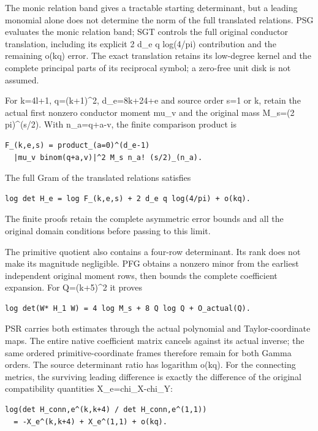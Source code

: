 \documentclass[
]{article}
\begin{document}
The monic relation band gives a tractable starting determinant, but a
leading monomial alone does not determine the norm of the full
translated relations. PSG evaluates the monic relation band; SGT
controls the full original conductor translation, including its explicit
2 d\_e q log(4/pi) contribution and the remaining o(kq) error. The exact
translation retains its low-degree kernel and the complete principal
parts of its reciprocal symbol; a zero-free unit disk is not assumed.

For k=4l+1, q=(k+1)\^{}2, d\_e=8k+24+e and source order s=1 or k, retain
the actual first nonzero conductor moment mu\_v and the original mass
M\_s=(2 pi)\^{}(s/2). With n\_a=q+a-v, the finite comparison product is

\begin{verbatim}
F_(k,e,s) = product_(a=0)^(d_e-1)
  |mu_v binom(q+a,v)|^2 M_s n_a! (s/2)_(n_a).
\end{verbatim}

The full Gram of the translated relations satisfies

\begin{verbatim}
log det H_e = log F_(k,e,s) + 2 d_e q log(4/pi) + o(kq).
\end{verbatim}

The finite proofs retain the complete asymmetric error bounds and all
the original domain conditions before passing to this limit.

The primitive quotient also contains a four-row determinant. Its rank
does not make its magnitude negligible. PFG obtains a nonzero minor from
the earliest independent original moment rows, then bounds the complete
coefficient expansion. For Q=(k+5)\^{}2 it proves

\begin{verbatim}
log det(W* H_1 W) = 4 log M_s + 8 Q log Q + O_actual(Q).
\end{verbatim}

PSR carries both estimates through the actual polynomial and
Taylor-coordinate maps. The entire native coefficient matrix cancels
against its actual inverse; the same ordered primitive-coordinate frames
therefore remain for both Gamma orders. The source determinant ratio has
logarithm o(kq). For the connecting metrics, the surviving leading
difference is exactly the difference of the original compatibility
quantities X\_e=chi\_X-chi\_Y:

\begin{verbatim}
log(det H_conn,e^(k,k+4) / det H_conn,e^(1,1))
  = -X_e^(k,k+4) + X_e^(1,1) + o(kq).
\end{verbatim}
\end{document}

